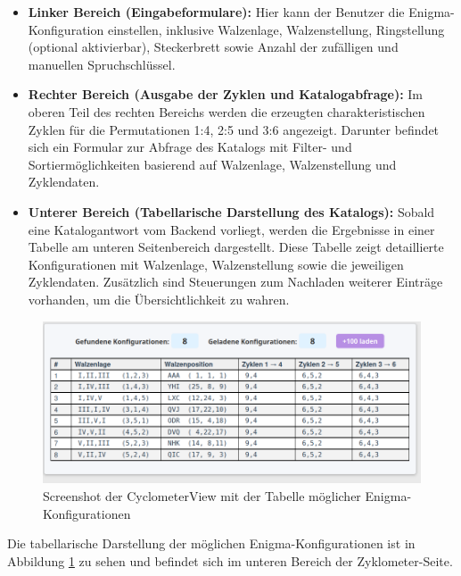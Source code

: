 \documentclass[12pt, ngerman, a4paper, numbers=noenddot]{article}
\begin{document}
\begin{itemize}
	\item \textbf{Linker Bereich (Eingabeformulare):}  
	Hier kann der Benutzer die Enigma-Konfiguration einstellen, inklusive Walzenlage, Walzenstellung, Ringstellung (optional aktivierbar), Steckerbrett sowie Anzahl der zufälligen und manuellen Spruchschlüssel.
	
	
	\newpage
	\item \textbf{Rechter Bereich (Ausgabe der Zyklen und Katalogabfrage):}  
	Im oberen Teil des rechten Bereichs werden die erzeugten charakteristischen Zyklen für die Permutationen 1:4, 2:5 und 3:6 angezeigt.  
	Darunter befindet sich ein Formular zur Abfrage des Katalogs mit Filter- und Sortiermöglichkeiten basierend auf Walzenlage, Walzenstellung und Zyklendaten.
	
	\item \textbf{Unterer Bereich (Tabellarische Darstellung des Katalogs):}  
	Sobald eine Katalogantwort vom Backend vorliegt, werden die Ergebnisse in einer Tabelle am unteren Seitenbereich dargestellt. Diese Tabelle zeigt detaillierte Konfigurationen mit Walzenlage, Walzenstellung sowie die jeweiligen Zyklendaten.  
	Zusätzlich sind Steuerungen zum Nachladen weiterer Einträge vorhanden, um die Übersichtlichkeit zu wahren.
\end{itemize}

	\begin{figure}[H]
	\centering
	\includegraphics[width=1\textwidth]{bilder/CyclometerView_Katalog.png}
	\caption{Screenshot der CyclometerView mit der Tabelle möglicher Enigma-Konfigurationen}
	\label{fig:CyclometerView_Katalog}
\end{figure}

Die tabellarische Darstellung der möglichen Enigma-Konfigurationen ist in Abbildung \ref{fig:CyclometerView_Katalog} zu sehen und befindet sich im unteren Bereich der Zyklometer-Seite.
\end{document}
